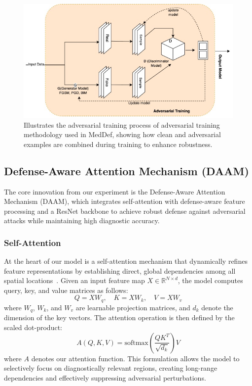 \documentclass[preprint,12pt]{elsarticle}
\begin{document}
\begin{figure}[!t]
\centerline{\includegraphics[width=\columnwidth]{fig/fig3.jpg}}
\caption{Illustrates the adversarial training process of adversarial training methodology used in MedDef, showing how clean and adversarial examples are combined during training to enhance robustness.}
\label{fig:adversarial_training}
\end{figure}

\subsection{Defense-Aware Attention Mechanism (DAAM)}
The core innovation from our experiment is the Defense-Aware Attention Mechanism (DAAM), which integrates self-attention with defense-aware feature processing and a ResNet backbone to achieve robust defense against adversarial attacks while maintaining high diagnostic accuracy\cite{Bello19}.

\subsubsection{Self-Attention}
At the heart of our model is a self-attention mechanism that dynamically refines feature representations by establishing direct, global dependencies among all spatial locations~\cite{Xu21}. Given an input feature map $X \in \mathbb{R}^{N \times d}$, the model computes query, key, and value matrices as follows:
\begin{equation}
Q = XW_q, \quad K = XW_k, \quad V = XW_v
\end{equation}
where $W_q$, $W_k$, and $W_v$ are learnable projection matrices, and $d_k$ denote the dimension of the key vectors. The attention operation is then defined by the scaled dot-product:
\begin{equation}
A(Q, K, V) = \text{softmax}\left(\frac{QK^T}{\sqrt{d_k}}\right)V
\end{equation}
where $A$ denotes our attention function. This formulation allows the model to selectively focus on diagnostically relevant regions, creating long-range dependencies and effectively suppressing adversarial perturbations.
\end{document}

